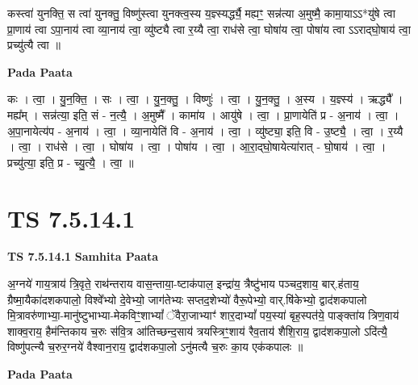 \documentclass[17pt]{extarticle}
\begin{document}
कस्त्वा॑ युनक्ति॒ स त्वा॑ युनक्तु॒ विष्णु॑स्त्वा युनक्त्व॒स्य य॒ज्ञ्स्यर्द्ध्यै॒ मह्यꣳ॒॒ सन्न॑त्या अ॒मुष्मै॒ कामा॒याऽऽ*यु॑षे त्वा प्रा॒णाय॑ त्वा ऽपा॒नाय॑ त्वा व्या॒नाय॑ त्वा॒ व्यु॑ष्ट्यै त्वा र॒य्यै त्वा॒ राध॑से त्वा॒ घोषा॑य त्वा॒ पोषा॑य त्वा ऽऽराद्घो॒षाय॑ त्वा॒ प्रच्यु॑त्यै त्वा ॥ \newline

\textbf{Pada Paata} \newline

कः । त्वा॒ । यु॒न॒क्ति॒ । सः । त्वा॒ । यु॒न॒क्तु॒ । विष्णुः॑ । त्वा॒ । यु॒न॒क्तु॒ । अ॒स्य । य॒ज्ञ्स्य॑ । ऋद्ध्यै᳚ । मह्य᳚म् । सन्न॑त्या॒ इति॒ सं - न॒त्यै॒ । अ॒मुष्मै᳚ । कामा॑य । आयु॑षे । त्वा॒ । प्रा॒णायेति॑ प्र - अ॒नाय॑ । त्वा॒ । अ॒पा॒नायेत्य॑प - अ॒नाय॑ । त्वा॒ । व्या॒नायेति॑ वि - अ॒नाय॑ । त्वा॒ । व्यु॑ष्ट्या॒ इति॒ वि - उ॒ष्ट्यै॒ । त्वा॒ । र॒य्यै । त्वा॒ । राध॑से । त्वा॒ । घोषा॑य । त्वा॒ । पोषा॑य । त्वा॒ । आ॒रा॒द्घो॒षायेत्या॑रात् - घो॒षाय॑ । त्वा॒ । प्रच्यु॑त्या॒ इति॒ प्र - च्यु॒त्यै॒ । त्वा॒ ॥  \newline




\section*{ TS 7.5.14.1 }

\textbf{TS 7.5.14.1 } \newline
\textbf{Samhita Paata} \newline

अ॒ग्नये॑ गाय॒त्राय॑ त्रि॒वृते॒ राथ॑न्तराय वास॒न्ताया॒-ष्टाक॑पाल॒ इन्द्रा॑य॒ त्रैष्टु॑भाय पञ्चद॒शाय॒ बार्.ह॑ताय॒ ग्रैष्मा॒यैका॑दशकपालो॒ विश्वे᳚भ्यो दे॒वेभ्यो॒ जाग॑तेभ्यः सप्तद॒शेभ्यो॑ वैरू॒पेभ्यो॒ वार्.षि॑केभ्यो॒ द्वाद॑शकपालो मि॒त्रावरु॑णाभ्या॒-मानु॑ष्टुभाभ्या-मेकविꣳ॒॒शाभ्यां᳚ ॅवैरा॒जाभ्याꣳ॑ शार॒दाभ्यां᳚ पय॒स्या॑ बृह॒स्पत॑ये॒ पाङ्क्ता॑य त्रिण॒वाय॑ शाक्व॒राय॒ हैम॑न्तिकाय च॒रुः स॑वि॒त्र आ॑तिच्छन्द॒साय॑ त्रयस्त्रिꣳ॒॒शाय॑ रैव॒ताय॑ शैशि॒राय॒ द्वाद॑शकपा॒लो ऽदि॑त्यै॒ विष्णु॑पत्न्यै च॒रुर॒ग्नये॑ वैश्वान॒राय॒ द्वाद॑शकपा॒लो ऽनु॑मत्यै च॒रुः का॒य एक॑कपालः ॥ \newline

\textbf{Pada Paata} \newline
\end{document}

